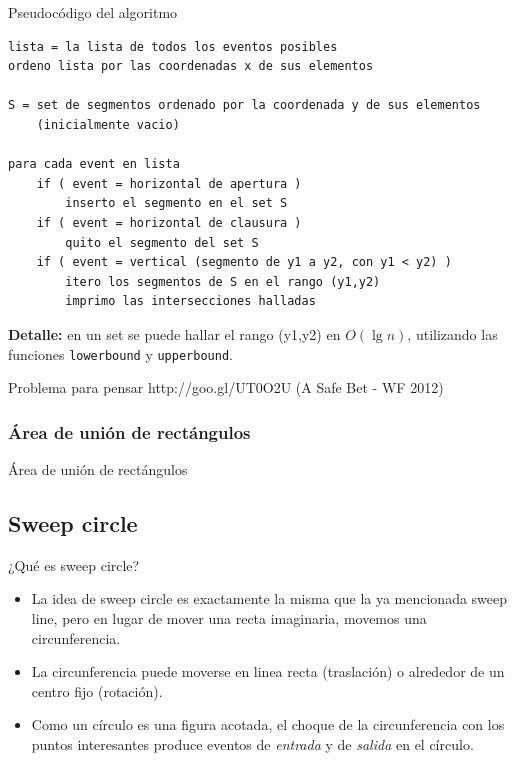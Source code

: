 \documentclass[compress]{beamer}
\begin{document}
\begin{frame}[fragile]{Pseudoc\'odigo del algoritmo}

\begin{lstlisting}
lista = la lista de todos los eventos posibles
ordeno lista por las coordenadas x de sus elementos

S = set de segmentos ordenado por la coordenada y de sus elementos
    (inicialmente vacio)

para cada event en lista
    if ( event = horizontal de apertura )
        inserto el segmento en el set S
    if ( event = horizontal de clausura )
        quito el segmento del set S
    if ( event = vertical (segmento de y1 a y2, con y1 < y2) )
        itero los segmentos de S en el rango (y1,y2)
        imprimo las intersecciones halladas

\end{lstlisting}

\textbf{Detalle:} en un set se puede hallar el rango (y1,y2) en $O(\lg n)$,
utilizando las funciones \texttt{lowerbound} y \texttt{upperbound}.

\end{frame}

\begin{frame}{Problema para pensar}
http://goo.gl/UT0O2U (A Safe Bet - WF 2012)
\end{frame}

\subsubsection{Área de unión de rectángulos}
\begin{frame}{Área de unión de rectángulos}

\end{frame}


\subsection{Sweep circle}

\begin{frame}{¿Qu\'e es sweep circle?}
\begin{itemize}
\item La idea de sweep circle es exactamente la misma que la ya mencionada sweep line, pero en lugar de mover una recta imaginaria, movemos una circunferencia.

\item La circunferencia puede moverse en linea recta (traslación) o alrededor de un centro fijo (rotación).

\item Como un círculo es una figura acotada, el choque de la circunferencia con los puntos interesantes produce eventos de \textit{entrada} y de \textit{salida} en el círculo.
\end{itemize}
\end{frame}
\end{document}
